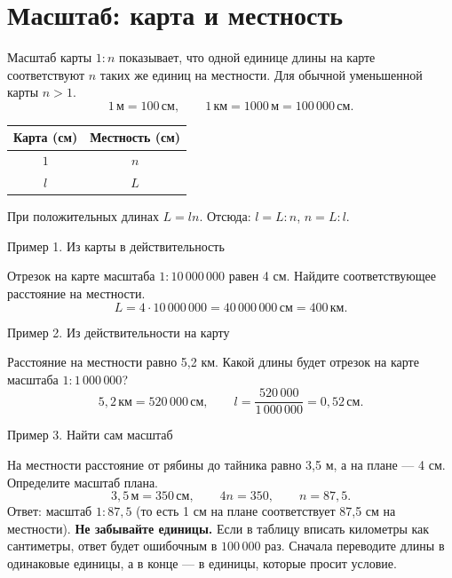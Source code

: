\documentclass[a4paper,12pt]{article}
\newcommand{\idea}[1]{\textcolor{darkaccent}{\textbf{#1}}}
\newcommand{\ex}[1]{\par\medskip\textcolor{darkaccent}{#1}\par\smallskip}
\newcommand{\cm}{\,\text{см}}
\newcommand{\km}{\,\text{км}}
\newcommand{\mtr}{\,\text{м}}
\begin{document}
\section{Масштаб: карта и местность}
Масштаб карты $1:n$ показывает, что одной единице длины на карте соответствуют $n$ таких же единиц на местности. Для обычной уменьшенной карты $n>1$.
\[
1\mtr=100\cm,\qquad 1\km=1000\mtr=100\,000\cm.
\]
\begin{center}
\renewcommand{\arraystretch}{1.2}
\begin{tabular}{cc}\toprule Карта (см) & Местность (см)\\\midrule $1$ & $n$\\ $l$ & $L$\\\bottomrule\end{tabular}
\end{center}
При положительных длинах $L=ln$. Отсюда: $l=L:n$, $n=L:l$.
\ex{Пример 1. Из карты в действительность}
Отрезок на карте масштаба $1:10\,000\,000$ равен 4 см. Найдите соответствующее расстояние на местности.
\[
L=4\cdot10\,000\,000=40\,000\,000\cm=400\km.
\]
\ex{Пример 2. Из действительности на карту}
Расстояние на местности равно 5,2 км. Какой длины будет отрезок на карте масштаба $1:1\,000\,000$?
\[
5{,}2\km=520\,000\cm,\qquad
l=\frac{520\,000}{1\,000\,000}=0{,}52\cm.
\]
\ex{Пример 3. Найти сам масштаб}
На местности расстояние от рябины до тайника равно 3,5 м, а на плане --- 4 см. Определите масштаб плана.
\[
3{,}5\mtr=350\cm,\qquad 4n=350,\qquad n=87{,}5.
\]
Ответ: масштаб $1:87{,}5$ (то есть 1 см на плане соответствует 87,5 см на местности).
\idea{Не забывайте единицы.} Если в таблицу вписать километры как сантиметры, ответ будет ошибочным в $100\,000$ раз. Сначала переводите длины в одинаковые единицы, а в конце --- в единицы, которые просит условие.
\clearpage
\end{document}
